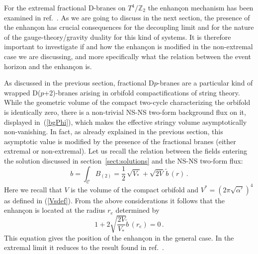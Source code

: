 \documentclass[a4paper,11pt]{article}
\newcommand{\eqref}[1]{(\ref{#1})}
\newcommand{\ZZ}{\mathbb{Z}}  \newcommand{\Zint}{\mathbb{Z}}
\begin{document}
For the extremal fractional D-branes on $T^4\!/\ZZ_2$ the enhan\c{c}on
mechanism has been examined in ref.~\cite{Frau:2000gk}. As we are
going to discuss in the next section, the presence of the enhan\c{c}on
has crucial consequences for the decoupling limit and for the nature
of the gauge-theory/gravity duality for this kind of systems. It is
therefore important to investigate if and how the enhan\c{c}on is
modified in the non-extremal case we are discussing, and more
specifically what the relation between the event horizon and the
enhan\c{c}on is.

As discussed in the previous section, fractional D$p$-branes are a
particular kind of wrapped D($p$+2)-branes arising in orbifold
compactifications of string theory. While the geometric volume of the
compact two-cycle characterizing the orbifold is identically zero,
there is a non-trivial NS-NS two-form background flux on it, displayed
in~\eqref{bgPhi}, which makes the effective stringy volume
asymptotically non-vanishing. In fact, as already explained in the
previous section, this asymptotic value is modified by the presence of
the fractional branes (either extremal or non-extremal). Let us recall
the relation between the fields entering the solution discussed in
section~\ref{sect:solutions} and the NS-NS two-form flux:
\begin{equation}
b = \int_{\mathcal{C}} B_{(2)} = \frac{1}{2} \,\sqrt{V_*} +
\sqrt{2V}\, \tilde b\,(r) \,.
\end{equation}
Here we recall that $V$ is the volume of the compact orbifold and
$V^*=(2\pi\sqrt{\alpha'})^4$ as defined in \eqref{Vsdef}. {}From the
above considerations it follows that the enhan\c{c}on is located at
the radius $r_e$ determined by
\begin{equation}
\label{eneq1}
1 + 2 \sqrt{\frac{2 V}{V_*}} \tilde b\,(r_e) = 0 \,.
\end{equation}
This equation gives the position of the enhan\c{c}on in the general
case. In the extremal limit it reduces to the result found in
ref.~\cite{Frau:2000gk}.
\end{document}
